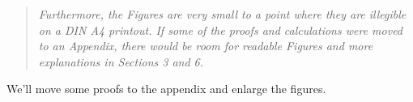 \documentclass{article}
\begin{document}
\begin{quote}
\textit{Furthermore, the Figures are very small to a point where they are illegible on a DIN A4 printout.
If some of the proofs and calculations were moved to an Appendix, there would be room for readable Figures and more explanations in Sections 3 and 6.}
\end{quote}
We'll move some proofs to the appendix and enlarge the figures.

\end{document}
